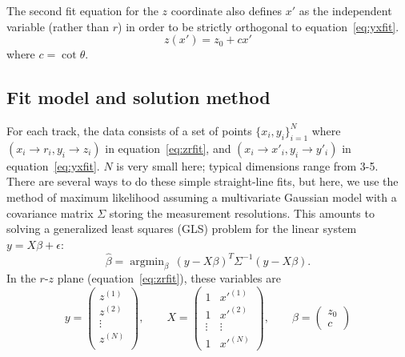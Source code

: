 \documentclass[12pt]{article}
\DeclareMathOperator*{\argmin}{argmin}
\begin{document}
The second fit equation for the $z$ coordinate also defines $x'$ as the independent variable (rather than $r$) in order to be strictly orthogonal to equation~\ref{eq:yxfit}.
\begin{equation} \label{eq:zrfit}
z(x') = z_0 + c x'
\end{equation}
where $c = \cot \theta$.


\subsection{Fit model and solution method} \label{sec:lsq}
 For each track, the data consists of a set of points $\{x_i,y_i\}_{i=1}^N$ where $(x_i \to r_i, y_i \to z_i)$ in equation~\ref{eq:zrfit}, and $(x_i \to x'_i, y_i \to y'_i)$ in equation~\ref{eq:yxfit}. $N$ is very small here; typical dimensions range from 3-5. There are several ways to do these simple straight-line fits, but here, we use the method of maximum likelihood assuming a multivariate Gaussian model with a covariance matrix $\Sigma$ storing the measurement resolutions. This amounts to solving a generalized least squares (GLS) problem for the linear system $y = X\beta + \epsilon$:
 \begin{equation}\label{eq:gls}
 \hat\beta = \argmin_{\beta} \, (y - X\beta)^T \Sigma^{-1} (y - X\beta).
 \end{equation}
In the $r$-$z$ plane (equation~\ref{eq:zrfit}), these variables are
\begin{equation} \label{eq:rzmat}
y = 
 \begin{pmatrix}
 z^{(1)}\\
 z^{(2)}\\
 \vdots \\
 z^{(N)}\\
 \end{pmatrix},
 \qquad
X =
 \begin{pmatrix}
  1 & x'^{(1)} \\
  1 & x'^{(2)} \\
  \vdots  & \vdots \\
  1 & x'^{(N)} 
 \end{pmatrix},
 \qquad
\beta = 
 \begin{pmatrix}
 z_0\\
 c
 \end{pmatrix}
\end{equation}
\end{document}
